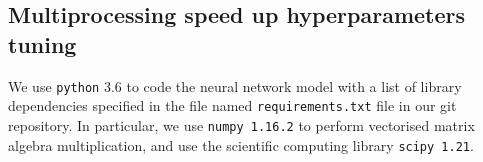 

\subsection{Multiprocessing speed up hyperparameters tuning}
We use \texttt{python} 3.6 to code the neural network model with a list of library dependencies specified in the file named \texttt{requirements.txt} file in our git repository. 
In particular, we use \texttt{numpy 1.16.2}  to perform vectorised matrix algebra multiplication, and use the scientific computing library \texttt{scipy 1.21}.


